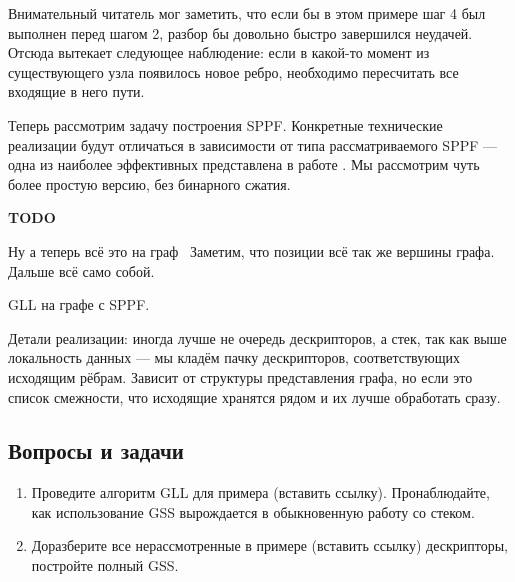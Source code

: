 Внимательный читатель мог заметить, что если бы в этом примере шаг 4 был выполнен перед шагом 2, разбор бы довольно быстро завершился неудачей. Отсюда вытекает следующее наблюдение: если в какой-то момент из существующего узла появилось новое ребро, необходимо пересчитать все входящие в него пути. 

Теперь рассмотрим задачу построения SPPF. Конкретные технические реализации будут отличаться в зависимости от типа рассматриваемого SPPF --- одна из наиболее эффективных представлена в работе \cite{10.1007/978-3-662-46663-6_5}. Мы рассмотрим чуть более простую версию, без бинарного сжатия.

\textbf{TODO}

Ну а теперь всё это на граф~\cite{Grigorev:2017:CPQ:3166094.3166104}
Заметим, что позиции всё так же вершины графа.
Дальше всё само собой.

\begin{example} GLL на графе с SPPF.
\end{example}


Детали реализации: иногда лучше не очередь дескрипторов, а стек, так как выше локальность данных --- мы кладём пачку дескрипторов, соответствующих исходящим рёбрам. Зависит от структуры представления графа, но если это список смежности, что исходящие хранятся рядом и их лучше обработать сразу.

\subsection{Вопросы и задачи}
\begin{enumerate}
  \item Проведите алгоритм GLL для примера (вставить ссылку). Пронаблюдайте, как использование GSS вырождается в обыкновенную работу со стеком. 
  \item Доразберите все нерассмотренные в примере (вставить ссылку) дескрипторы, постройте полный GSS.
\end{enumerate}

